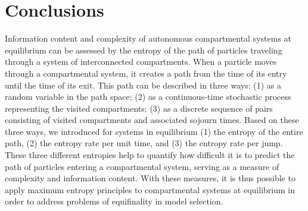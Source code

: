 \documentclass[smallextended]{svjour3}
\begin{document}
\section{Conclusions}
Information content and complexity of autonomous compartmental systems at equilibrium can be assessed by the entropy of the path of particles traveling through a system of interconnected compartments. When a particle moves through a compartmental system, it creates a path from the time of its entry until the time of its exit. This path can be described in three ways: (1) as a random variable in the path space; (2) as a continuous-time stochastic process representing the visited compartments; (3) as a discrete sequence of pairs consisting of visited compartments and associated sojourn times. 
Based on these three ways, we introduced for systems in equilibrium (1) the entropy of the entire path, (2) the entropy rate per unit time, and (3) the entropy rate per jump. These three different entropies help to quantify how difficult it is to predict the path of particles entering a compartmental system, serving as a measure of complexity and information content. With these measures, it is thus possible to apply maximum entropy principles to compartmental systems at equilibrium in order to address problems of equifinality in model selection. 

\end{document}
